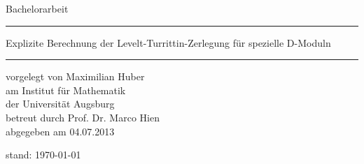 \begin{titlepage}
  \thispagestyle{empty}
  \newcommand{\Rule}{%
    \textcolor{black}{\rule{\textwidth}{0.5mm}}%
  }
  \begin{center}\sffamily
    \normalfont\sffamily\large
    Bachelorarbeit
    \Rule
    \vspace{5mm}
    \Huge{Explizite Berechnung der Levelt-Turrittin-Zerlegung für spezielle
      D-Moduln}
    \vspace{1mm}
    \Rule
  \end{center}
    \normalfont\sffamily\large vorgelegt von \Large Maximilian Huber\\
    \normalfont\sffamily\large am            \Large Institut für Mathematik\\
    \normalfont\sffamily\large der           \Large Universität Augsburg\\
    \normalfont\sffamily\large betreut durch \Large Prof. Dr. Marco Hien\\
    \normalfont\sffamily\large abgegeben am  \Large 04.07.2013\\
    \vfill
    \vfill
  \ifnum{}
    \begin{center}
      \normalfont\sffamily\large stand: \today
    \end{center}
  \fi
\end{titlepage}
